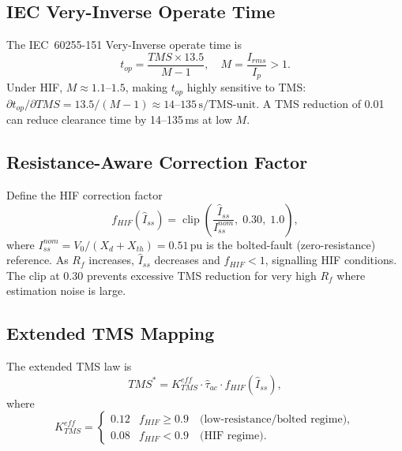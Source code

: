 \documentclass[12pt,a4paper]{article}
\theoremstyle{definition}
\theoremstyle{plain}
\begin{document}
\subsection{IEC Very-Inverse Operate Time}
\label{sec:law:iec}

The IEC~60255-151 Very-Inverse operate time \citep{IEC60255-151} is
\begin{equation}
  t_{op} = \frac{TMS \times 13.5}{M - 1},
  \quad M = \frac{I_{rms}}{I_p} > 1.
  \label{eq:law:top}
\end{equation}
Under HIF, $M \approx 1.1$--$1.5$, making $t_{op}$ highly sensitive to TMS:
$\partial t_{op}/\partial TMS = 13.5/(M-1) \approx 14$--$135\,\text{s/TMS-unit}$.
A TMS reduction of 0.01 can reduce clearance time by 14--135\,ms at low $M$.

\subsection{Resistance-Aware Correction Factor}
\label{sec:law:factor}

Define the HIF correction factor
\begin{equation}
  f_{HIF}(\hat{I}_{ss}) =
  \operatorname{clip}\!\left(\frac{\hat{I}_{ss}}{I_{ss}^{nom}},\;0.30,\;1.0\right),
  \label{eq:law:fhif}
\end{equation}
where $I_{ss}^{nom} = V_0/(X_d + X_{th}) = 0.51\,\text{pu}$ is the
bolted-fault (zero-resistance) reference.  As $R_f$ increases,
$\hat{I}_{ss}$ decreases and $f_{HIF} < 1$, signalling HIF conditions.
The clip at 0.30 prevents excessive TMS reduction for very high $R_f$ where
estimation noise is large.

\subsection{Extended TMS Mapping}
\label{sec:law:mapping}

The extended TMS law is
\begin{equation}
  TMS^* = K_{TMS}^{eff} \cdot \hat{\tau}_{ac} \cdot f_{HIF}(\hat{I}_{ss}),
  \label{eq:law:tms}
\end{equation}
where
\begin{equation}
  K_{TMS}^{eff} =
  \begin{cases}
    0.12 & f_{HIF} \geq 0.9 \quad \text{(low-resistance/bolted regime)}, \\
    0.08 & f_{HIF} < 0.9  \quad \text{(HIF regime)}.
  \end{cases}
  \label{eq:law:Keff}
\end{equation}
\end{document}
